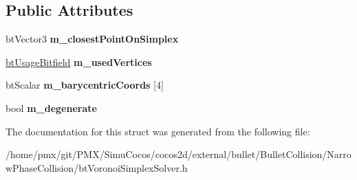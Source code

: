 \subsection*{Public Attributes}
\begin{DoxyCompactItemize}
\item 
\mbox{\label{structbtSubSimplexClosestResult_ae4c08daa4f3ea17aa7c2164f81a63004}} 
bt\+Vector3 {\bfseries m\+\_\+closest\+Point\+On\+Simplex}
\item 
\mbox{\label{structbtSubSimplexClosestResult_acde7d5b6e96d4f2819e4ad873a97a7a1}} 
\hyperlink{structbtUsageBitfield}{bt\+Usage\+Bitfield} {\bfseries m\+\_\+used\+Vertices}
\item 
\mbox{\label{structbtSubSimplexClosestResult_a2fce33499a7250c5cf36f4150f7d69d2}} 
bt\+Scalar {\bfseries m\+\_\+barycentric\+Coords} \mbox{[}4\mbox{]}
\item 
\mbox{\label{structbtSubSimplexClosestResult_a4f1e6160713c73d843a855851557475a}} 
bool {\bfseries m\+\_\+degenerate}
\end{DoxyCompactItemize}


The documentation for this struct was generated from the following file\+:\begin{DoxyCompactItemize}
\item 
/home/pmx/git/\+P\+M\+X/\+Simu\+Cocos/cocos2d/external/bullet/\+Bullet\+Collision/\+Narrow\+Phase\+Collision/bt\+Voronoi\+Simplex\+Solver.\+h\end{DoxyCompactItemize}
